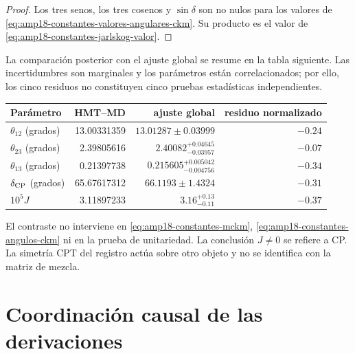 \begin{proof}
Los tres senos, los tres cosenos y \(\sin\delta\) son no nulos para los
valores de \eqref{eq:amp18-constantes-valores-angulares-ckm}. Su producto
es el valor de \eqref{eq:amp18-constantes-jarlskog-valor}.
\end{proof}

La comparación posterior con el ajuste global se resume en la tabla
siguiente. Las incertidumbres son marginales y los parámetros están
correlacionados; por ello, los cinco residuos no constituyen cinco pruebas
estadísticas independientes.
\begin{center}
\begin{tabular}{@{}lrrr@{}}
\toprule
Parámetro & HMT--MD & ajuste global & residuo normalizado\\
\midrule
\(\theta_{12}\) (grados)
&13.00331359&\(13.01287\pm0.03999\)&\(-0.24\)\\
\(\theta_{23}\) (grados)
&2.39805616&\(2.40082^{+0.04645}_{-0.03957}\)&\(-0.07\)\\
\(\theta_{13}\) (grados)
&0.21397738&\(0.215605^{+0.005042}_{-0.004756}\)&\(-0.34\)\\
\(\delta_{\rm CP}\) (grados)
&65.67617312&\(66.1193\pm1.4324\)&\(-0.31\)\\
\(10^5J\)
&3.11897233&\(3.16^{+0.13}_{-0.11}\)&\(-0.37\)\\
\bottomrule
\end{tabular}
\end{center}
El contraste no
interviene en \eqref{eq:amp18-constantes-mckm},
\eqref{eq:amp18-constantes-angulos-ckm} ni en la prueba de unitariedad.
La conclusión \(J\neq0\) se refiere a CP. La simetría CPT del registro actúa
sobre otro objeto y no se identifica con la matriz de mezcla.

\section{Coordinación causal de las derivaciones}

